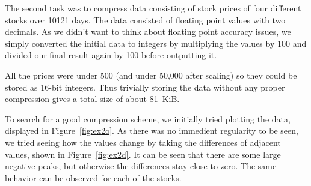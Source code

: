 \documentclass{article}
\begin{document}
The second task was to compress data consisting of stock prices of four different stocks over 10121 days.
The data consisted of floating point values with two decimals.
As we didn't want to think about floating point accuracy issues, we simply converted the initial data to integers by multiplying the values by 100 and divided our final result again by 100 before outputting it.

All the prices were under 500 (and under 50,000 after scaling) so they could be stored as 16-bit integers.
Thus trivially storing the data without any proper compression gives a total size of about 81~KiB.

To search for a good compression scheme, we initially tried plotting the data, displayed in Figure~\ref{fig:ex2o}.
As there was no immedient regularity to be seen, we tried seeing how the values change by taking the differences of adjacent values, shown in Figure~\ref{fig:ex2d}.
It can be seen that there are some large negative peaks, but otherwise the differences stay close to zero.
The same behavior can be observed for each of the stocks.
\end{document}
